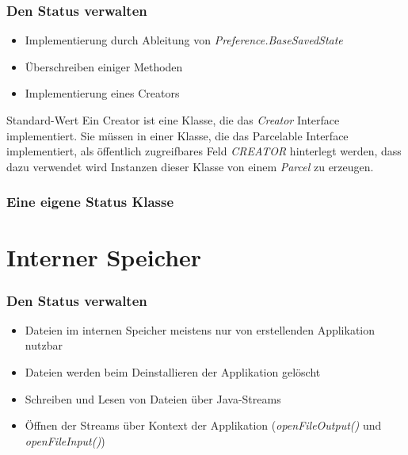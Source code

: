 \begin{frame}
   \frametitle{Den Status verwalten}
   \begin{itemize}
      \item Implementierung durch Ableitung von \emph{Preference.BaseSavedState}
      \item Überschreiben einiger Methoden
      \item Implementierung eines Creators
   \end{itemize}

   \begin{alertblock}{Standard-Wert}
      Ein Creator ist eine Klasse, die das \emph{Creator} Interface implementiert. 
      Sie müssen in einer Klasse, die das Parcelable Interface implementiert, als 
      öffentlich zugreifbares Feld \emph{CREATOR} hinterlegt werden, dass dazu verwendet wird 
      Instanzen dieser Klasse von einem \emph{Parcel} zu erzeugen.
   \end{alertblock}
\end{frame}

\begin{frame}
   \frametitle{Eine eigene Status Klasse}
   
\end{frame}

\section{Interner Speicher}
\begin{frame}
   \frametitle{Den Status verwalten}
   \begin{itemize}
      \item Dateien im internen Speicher meistens nur von erstellenden Applikation 
      	nutzbar
      \item Dateien werden beim Deinstallieren der Applikation gelöscht
      \item Schreiben und Lesen von Dateien über Java-Streams
      \item Öffnen der Streams über Kontext der Applikation (\emph{openFileOutput()} und 
			\emph{openFileInput()})
   \end{itemize}
\end{frame}

